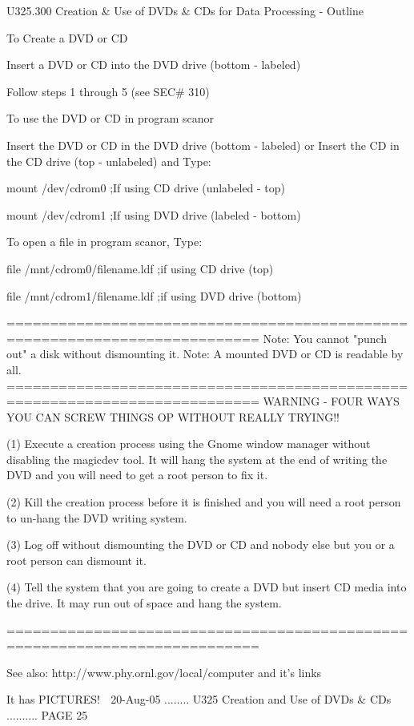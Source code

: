  
   U325.300  Creation & Use of DVDs & CDs for Data Processing - Outline
 
   To Create a DVD or CD
 
   Insert a DVD or CD into the DVD drive (bottom - labeled)
 
   Follow steps 1 through 5 (see SEC# 310)
 
 
   To use the DVD or CD in program scanor
 
   Insert the DVD or CD in the DVD drive (bottom - labeled)
   or
   Insert the CD in the CD drive         (top  - unlabeled)
   and Type:
 
   mount /dev/cdrom0              ;If using CD  drive (unlabeled - top)
 
   mount /dev/cdrom1              ;If using DVD drive (labeled - bottom)
 
 
   To open a file in  program scanor, Type:
 
   file /mnt/cdrom0/filename.ldf  ;if using CD  drive (top)
 
   file /mnt/cdrom1/filename.ldf  ;if using DVD drive (bottom)
 
   ===========================================================================
   Note: You cannot "punch out" a disk without dismounting it.
   Note: A mounted DVD or CD is readable by all.
   ===========================================================================
       WARNING - FOUR WAYS YOU CAN SCREW THINGS OP WITHOUT REALLY TRYING!!
 
   (1)  Execute  a  creation  process  using  the Gnome window manager without
   disabling the magicdev tool. It will hang the system at the end of  writing
   the DVD and you will need to get a root person to fix it.
 
   (2)  Kill  the  creation  process before it is finished and you will need a
   root person to un-hang the DVD writing system.
 
   (3) Log off without dismounting the DVD or CD and nobody else but you or  a
   root person can dismount it.
 
   (4)  Tell the system that you are going to create a DVD but insert CD media
   into the drive. It may run out of space and hang the system.
 
   ===========================================================================
 
       See also:   http://www.phy.ornl.gov/local/computer   and it's links
 
                                It has PICTURES!
    
   20-Aug-05 ........ U325  Creation and Use of DVDs & CDs .......... PAGE  25
 
